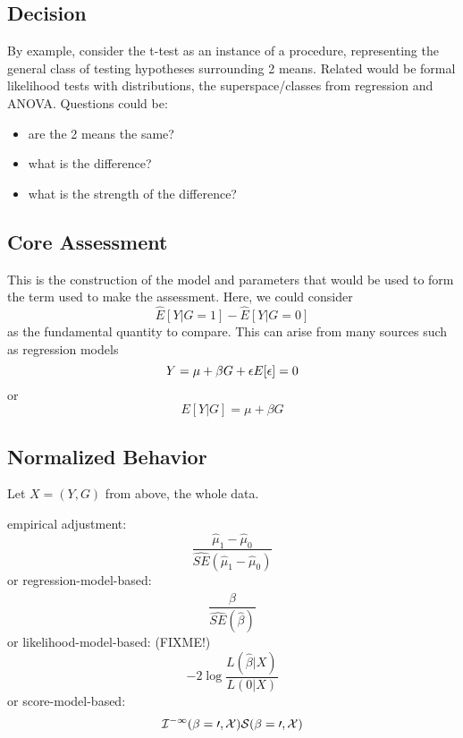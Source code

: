 \documentclass{article}
\begin{document}
\subsection{Decision}
\label{sec:components:decision}

By example, consider the t-test as an instance of a procedure,
representing the general class of testing hypotheses surrounding 2
means.  Related would be formal likelihood tests with distributions,
the superspace/classes from regression and ANOVA.
Questions could be:
\begin{itemize}
\item are the 2 means the same?
\item what is the difference?
\item what is the strength of the difference?
\end{itemize}

\subsection{Core Assessment}
\label{sec:components:assessment}

This is the construction of the model and parameters that would be
used to form the term used to make the assessment.  Here, we could
consider 
\begin{equation}
  \label{eq:assess:ex:1}
  \hat{E}[Y|G=1] - \hat{E}[Y|G=0]
\end{equation}
as the fundamental quantity to compare.    This can arise from many
sources such as regression models
\begin{equation}
  \label{eq:assess:ex:2}
  Y = \mu + \beta G + \epsilon \\
  E[\epsilon] = 0
\end{equation}
or 
\begin{equation}
  \label{eq:assess:ex:2}
  E[Y|G] = \mu + \beta G 
\end{equation}

\subsection{Normalized Behavior}
\label{sec:components:normbeh}
Let $X=(Y,G)$ from above, the whole data.

empirical adjustment:
\begin{equation}
  \label{eq:norm:ex:1}
  \frac{ \hat\mu_1 - \hat\mu_0}%
  {\hat{SE}(\hat\mu_1 - \hat\mu_0)}
\end{equation}
or regression-model-based:
\begin{equation}
  \label{eq:norm:ex:2}
  \frac{ \hat\beta}%
  {\hat{SE}(\hat\beta)}
\end{equation}
or likelihood-model-based: (FIXME!)
\begin{equation}
  \label{eq:norm:ex:3}
  -2 \log \frac{ L(\hat\beta|X)}%
  {L(0|X)}
\end{equation}
or score-model-based:
\begin{equation}
  \label{eq:norm:ex:4}
  \cal{I}^{-1}(\beta=0,X) S(\beta=0,X) 
\end{equation}
\end{document}
